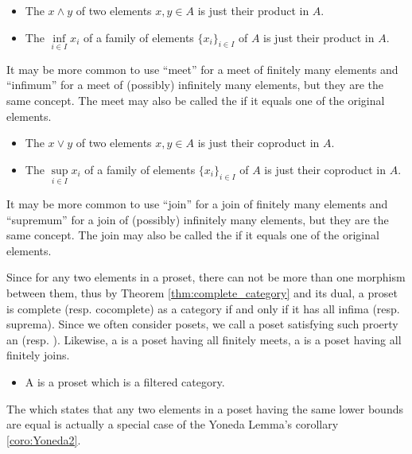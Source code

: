   \begin{itemize}
    \item The  $x\wedge y$ of two elements $x,y\in A$ is just their product in $A$.
    \item The  $\inf\limits_{i\in I}x_i$ of a family of elements $\{x_i\}_{i\in I}$ of $A$ is just their product in $A$.
  \end{itemize}
  \begin{rem}
    It may be more common to use ``meet'' for a meet of finitely many elements and ``infimum'' for a meet of (possibly) infinitely many elements, but they are the same concept. The meet may also be called the  if it equals one of the original elements.
  \end{rem}
  \begin{itemize}
    \item The  $x\vee y$ of two elements $x,y\in A$ is just their coproduct in $A$.
    \item The  $\sup\limits_{i\in I}x_i$ of a family of elements $\{x_i\}_{i\in I}$ of $A$ is just their coproduct in $A$.
  \end{itemize}
  \begin{rem}
    It may be more common to use ``join'' for a join of finitely many elements and ``supremum'' for a join of (possibly) infinitely many elements, but they are the same concept. The join may also be called the  if it equals one of the original elements.
  \end{rem}

  Since for any two elements in a proset, there can not be more than one morphism between them, thus by Theorem \ref{thm:complete_category} and its dual, a proset is complete (resp. cocomplete) as a category if and only if it has all infima (resp. suprema).
  Since we often consider posets, we call a poset satisfying such proerty an  (resp. ).
  Likewise, a  is a poset having all finitely meets, a  is a poset having all finitely joins.

  \begin{itemize}
    \item A  is a proset which is a filtered category.
  \end{itemize}
  
  \begin{ex}
    The  which states that any two elements in a poset having the same lower bounds are equal is actually a special case of the Yoneda Lemma's corollary \ref{coro:Yoneda2}.%
  \end{ex}


